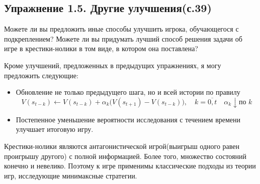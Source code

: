 \subsection{Упражнение 1.5. Другие улучшения(с.39)}
Можете ли вы предложить иные способы улучшить игрока, обучающегося с подкреплением? Можете ли вы придумать лучший способ решения задачи об игре в крестики-нолики в том виде, в котором она поставлена?
\begin{solution}
   Кроме улучшений, предложенных в предыдущих упражнениях, я могу предложить следующие:
   \begin{itemize}
       \item Обновление не только предыдущего шага, но и всей истории по правилу
        \[
            V(s_{t-k}) \leftarrow V(s_{t-k}) 
            + \alpha_k \bigl( V(s_{t+1}) - V(s_{t-k}) \bigr),
            \quad k=\overline{0,t} \quad\alpha_k \downarrow \text{по } k
        \]
       \item Постепенное уменьшение вероятности исследования с течением времени улучшает итоговую игру.
   \end{itemize}
   Крестики-нолики являются антагонистической игрой(выигрыш одного равен проигрышу другого) с полной информацией. Более того, множество состояний конечно и невелико. Поэтому к игре применимы классические подходы из теории игр, исследующие минимаксные стратегии.
\end{solution}
